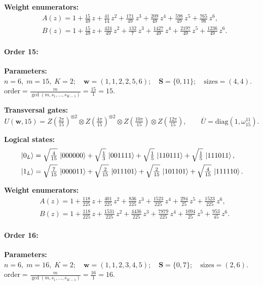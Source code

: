 \documentclass[pdflatex,sn-nature]{sn-jnl}%
\theoremstyle{thmstyleone}%
\theoremstyle{thmstyletwo}%
\theoremstyle{thmstylethree}%
\begin{document}
\begin{appendices}
\noindent\textbf{Weight enumerators:}
\begin{align*}
    &A(z) = 1 + \tfrac{15}{49}\,z + \tfrac{41}{14}\,z^{2} + \tfrac{171}{49}\,z^{3} + \tfrac{209}{49}\,z^{4} + \tfrac{598}{49}\,z^{5} + \tfrac{765}{98}\,z^{6}, \\
    &B(z) = 1 + \tfrac{15}{49}\,z + \tfrac{424}{49}\,z^{2} + \tfrac{132}{7}\,z^{3} + \tfrac{1427}{49}\,z^{4} + \tfrac{2197}{49}\,z^{5} + \tfrac{1236}{49}\,z^{6}.
\end{align*}

\paragraph{\textbf{Order 15:}}
\noindent\textbf{Parameters:} $n=6,\; m=15,\; K=2;\quad \mathbf w=(1, 1, 2, 2, 5, 6);\quad \mathbf S=\{0, 11\};\quad \text{sizes}=\left(4, 4\right).$ $\displaystyle \text{order}=\frac{m}{\gcd(m,s_1,\dots,s_{K-1})}=\frac{15}{1}=15.$

\noindent\textbf{Transversal gates:}
\[
    U(\mathbf w,15)=Z \left(\tfrac{2\pi}{15}\right)^{\otimes2} \otimes Z \left(\tfrac{4\pi}{15}\right)^{\otimes2} \otimes Z \left(\tfrac{10\pi}{15}\right) \otimes Z \left(\tfrac{12\pi}{15}\right),\qquad
    \overline U=\mathrm{diag}(1,\omega_{15}^{11}).
\]

\noindent\textbf{Logical states:}
\begin{align*}
    &\ket{0_L} = \sqrt{\tfrac{4}{15}}\,\ket{000000} + \sqrt{\tfrac{1}{3}}\,\ket{001111} + \sqrt{\tfrac{1}{5}}\,\ket{110111} + \sqrt{\tfrac{1}{5}}\,\ket{111011}, \\
    &\ket{1_L} = \sqrt{\tfrac{7}{15}}\,\ket{000011} + \sqrt{\tfrac{2}{15}}\,\ket{011101} + \sqrt{\tfrac{2}{15}}\,\ket{101101} + \sqrt{\tfrac{4}{15}}\,\ket{111110}.
\end{align*}

\noindent\textbf{Weight enumerators:}
\begin{align*}
    &A(z) = 1 + \tfrac{118}{225}\,z + \tfrac{401}{225}\,z^{2} + \tfrac{836}{225}\,z^{3} + \tfrac{1523}{225}\,z^{4} + \tfrac{294}{25}\,z^{5} + \tfrac{1523}{225}\,z^{6}, \\
    &B(z) = 1 + \tfrac{118}{225}\,z + \tfrac{1531}{225}\,z^{2} + \tfrac{4436}{225}\,z^{3} + \tfrac{7879}{225}\,z^{4} + \tfrac{1094}{25}\,z^{5} + \tfrac{953}{45}\,z^{6}.
\end{align*}

\paragraph{\textbf{Order 16:}}
\noindent\textbf{Parameters:} $n=6,\; m=16,\; K=2;\quad \mathbf w=(1, 1, 2, 3, 4, 5);\quad \mathbf S=\{0, 7\};\quad \text{sizes}=\left(2, 6\right).$ $\displaystyle \text{order}=\frac{m}{\gcd(m,s_1,\dots,s_{K-1})}=\frac{16}{1}=16.$


\end{appendices}
\end{document}
